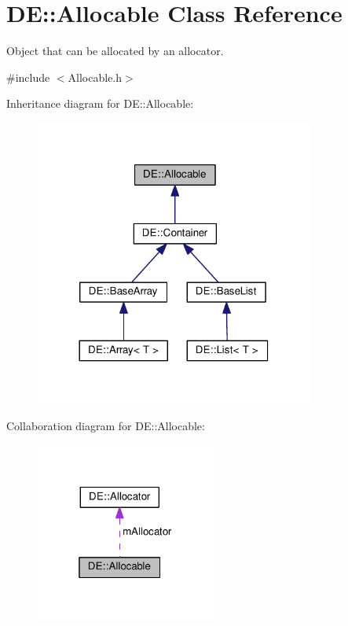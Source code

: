 \hypertarget{classDE_1_1Allocable}{}\section{DE\+:\+:Allocable Class Reference}
\label{classDE_1_1Allocable}


Object that can be allocated by an allocator.  




{\ttfamily \#include $<$Allocable.\+h$>$}



Inheritance diagram for DE\+:\+:Allocable\+:
\nopagebreak
\begin{figure}[H]
\begin{center}
\leavevmode
\includegraphics[width=260pt]{classDE_1_1Allocable__inherit__graph}
\end{center}
\end{figure}


Collaboration diagram for DE\+:\+:Allocable\+:
\nopagebreak
\begin{figure}[H]
\begin{center}
\leavevmode
\includegraphics[width=169pt]{classDE_1_1Allocable__coll__graph}
\end{center}
\end{figure}
